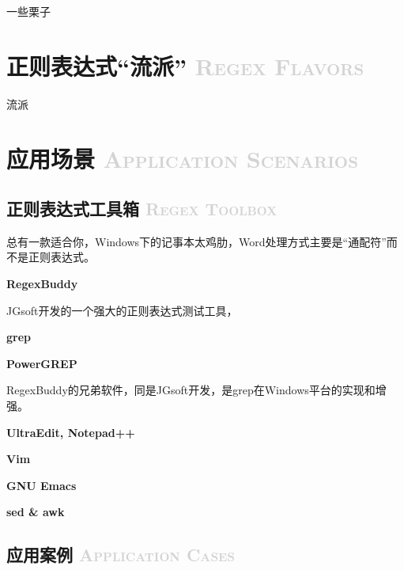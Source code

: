 \documentclass[12pt,a4paper,twoside]{ctexart}
\begin{document}
\begin{multicols}{2}
一些栗子 \par


\end{multicols}

\section[正则表达式“流派”]{正则表达式“流派” \textcolor{lightgray}{\textsc{Regex Flavors}}}
\label{sec:flavor}

\begin{multicols}{2}
流派

\end{multicols}


\section[应用场景]{应用场景 \textcolor{lightgray}{\textsc{Application Scenarios}}}
\label{sec:scenarios}

\subsection[正则表达式工具箱]{正则表达式工具箱 \textcolor{lightgray}{\textsc{Regex Toolbox}}}
\label{sec:toolbox}

总有一款适合你，Windows下的记事本太鸡肋，Word处理方式主要是“通配符”而不是正则表达式。 \par

\begin{multicols}{2}
  
\noindent\textbf{RegexBuddy} \par
JGsoft开发的一个强大的正则表达式测试工具， \par

\noindent\textbf{grep}

\noindent\textbf{PowerGREP} \par
RegexBuddy的兄弟软件，同是JGsoft开发，是grep在Windows平台的实现和增强。

\noindent\textbf{UltraEdit, Notepad++}

\noindent\textbf{Vim} \par

\noindent\textbf{GNU Emacs} \par

\noindent\textbf{sed \& awk}

\end{multicols}

\subsection[应用案例]{应用案例 \textcolor{lightgray}{\textsc{Application Cases}}}
\label{sec:cases}
\end{document}
